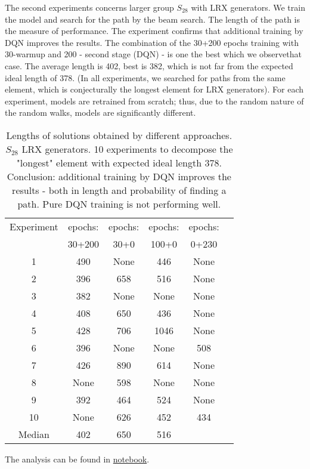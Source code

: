 \documentclass[atmp]{ipart_v1}
\numberwithin{equation}{section}
\theoremstyle{plain}%
\begin{document}
The second experiments concerns larger group $S_{28}$ with LRX generators. We train the model and search for the path by the beam search. The length of the path is the measure of performance. The experiment confirms that additional training by DQN improves the results. The combination of the 30+200 epochs training with 30-warmup and 200 - second stage (DQN) - is one the best which we observethat case. The average length is 402, best is 382, which is not far from the expected ideal length of 378. (In all experiments, we searched for paths from the same element, which is conjecturally the longest element for LRX generators). For each experiment, models are retrained from scratch; thus, due to the random nature of the random walks, models are significantly different. 
\begin{table}[h]
  \centering
  \begin{tabular}{|c|c|c|c|c|c|}
  \hline
  Experiment  & epochs:  & epochs: & epochs: & epochs:  \\
  &  30+200  &  30+0 & 100+0 &  0+230 \\
  \hline
  1 &  490 & None  & 446  &  None \\%
  2 &  396 & 658 & 516  &  None \\%
  3 &  382 & None  & None  & None  \\%
  4 &  408 & 650 & 436  &  None \\ %
  5 &  428 & 706 & 1046  & None  \\ %
  6 &  396 & None  & None  & 508  \\ %
  7 &  426 & 890 & 614  &  None \\ %
  8 &  None& 598 & None &  None \\ %
  9 &  392 & 464 & 524  &  None  \\ %
  10 & None& 626 & 452  &  434 \\ %
  Median & 402& 650 & 516 & \\
  \hline
  \end{tabular}
  \captionsetup{skip=10pt} 
  \caption{Lengths of solutions obtained by different approaches. 
  $S_{28}$ LRX generators. 10 experiments to decompose the "longest" element with expected ideal length 378. Conclusion: additional training by DQN improves the results - both in length and probability of finding a path. Pure DQN training is not performing well. }
  \label{tab:example}
\end{table}

The analysis can be found in \href{https://www.kaggle.com/code/alexandervc/lrx-cayleypy-rl-mdqn}{notebook}.  
\end{document}

